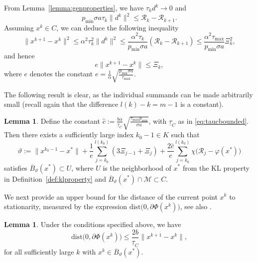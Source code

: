 \documentclass[a4paper, 12pt]{article}
\numberwithin{equation}{section}
\theoremstyle{bolddef}
\theoremstyle{definition}
\theoremstyle{boldplain}
\newtheorem{lemma}[definition]{Lemma}
\newcommand{\xk}{x^k}
\newcommand{\dk}{d^k}
\newcommand{\tauk}{\tau_k}
\newcommand{\xkp}{x^{k+1}}
\newcommand{\pmin}{p_{\min}}
\newcommand{\taug}{\underline{\tau}}
\newcommand{\taumax}{\tau_\mathrm{max}}
\newcommand{\Rvalue}{\mathcal{R}}
\newcommand{\dist}{\mathrm{dist}}
\newcommand{\clball}{\overline{B}}
\begin{document}
From Lemma~\ref{lemma:genproperties}, we have $\tauk \dk \to 0$ and 
\begin{equation*}
	\pmin \sigma a \tauk \|\dk\|^2 \leq \Rvalue_k - \Rvalue_{k+1}.
\end{equation*}
Assuming $x^k \in C$, we can deduce the following inequality
\begin{equation*}
	\| \xkp - \xk \|^2  \leq \alpha^2 \tauk^2 \|\dk\|^2 
		 \leq \frac{\alpha^2 \tauk}{\pmin \sigma a} (\Rvalue_k - \Rvalue_{k+1}) \leq \frac{\alpha^2 \taumax}{\pmin \sigma a} \Xi_k^2,
\end{equation*}
and hence
\begin{equation}\label{eq:normxi}
	e \|\xkp -\xk\| \leq \Xi_k,
\end{equation}
where $e$ denotes the constant $e = \frac{1}{\alpha} \sqrt{\frac{\pmin \sigma a}{\taumax}}$.

The following result is clear, as the individual summands can be made arbitrarily small (recall again that the difference $ l(k) - k = m - 1 $ is
a constant).

\begin{lemma}\label{Lem:alpha}
Define the constant $ \hat{c} := \frac{b \alpha}{\taug_C} \sqrt{\frac{\taumax \pmin}{\sigma a}}$, with $\taug_C$ as in \eqref{eq:taucbounded}. Then there
exists a sufficiently large index $k_0-1 \in K$ such that
\begin{equation}
	\vartheta := \|x^{k_0-1} - x^*\| + \frac{1}{e} \sum_{j = k_0}^{l(k_0)} (3 \Xi_{j-1} + \Xi_j) + \frac{2 \hat c}{e} \sum_{j = k_0}^{l(k_0)} \chi \big( \Rvalue_j - \varphi(x^*) \big)
\end{equation}
	satisfies $\clball_\vartheta(x^*) \subset U$, where $U$ is the neighborhood of $x^*$ from the KL property in Definition~\ref{def:klproperty} and $\clball_\vartheta(x^*) \cap \mathcal{M} \subset C$.
\end{lemma}

We next provide an upper bound for the distance of the current point $ \xk $ to
stationarity, measured by the expression $ \dist \big( 0, \partial \Phi(\xk) \big) $, see also \cite{Qian2024}.

\begin{lemma}\label{lemma:bs}
Under the conditions specified above, we have
\begin{equation}\label{distbound}
	\dist \big( 0, \partial \Phi(\xk) \big) 
	\leq \frac{2 b}{\taug_C} \| \xkp - \xk\|,
\end{equation}
for all sufficiently large $k$ with $\xk \in \clball_\vartheta(x^*)$.
\end{lemma}
\end{document}
